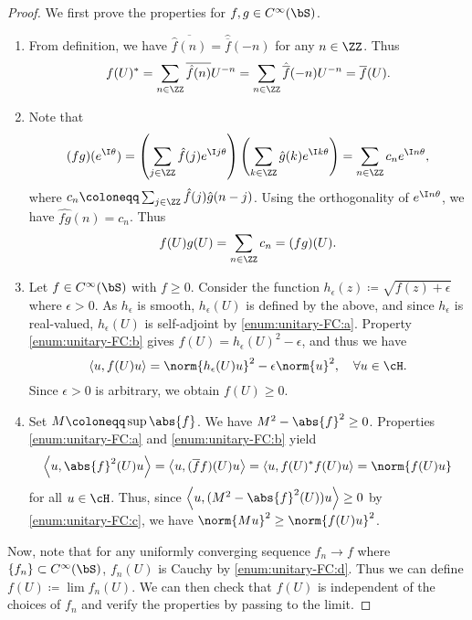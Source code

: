 \documentclass[oneside,reqno,letterpaper]{amsart}
\begin{document}
\begin{proof}
  We first prove the properties for \(f, g \in C^{\infty}(\bS)\). 
  \begin{enumerate}[label=(\alph*)]
  \item %
  From definition, we have \(\overline{\hat{f}(n)} = \hat{\overline{f}}(-n)\) for any \(n \in \ZZ\). 
  Thus
  \[
    f(U)^* 
    = \sum_{n \in \ZZ} \overline{\hat{f}(n)} U^{-n}
    = \sum_{n \in \ZZ} \hat{\overline{f}}(-n) U^{-n}
    = \overline{f}(U) .   
  \] 

  \item %
    Note that  
    \[
      (fg)(e^{\I \theta}) 
      = \left( \sum_{j \in \ZZ} \hat{f}(j) e^{\I j \theta} \right) \left( \sum_{k \in \ZZ} \hat{g}(k) e^{\I k \theta} \right) 
      = \sum_{n \in \ZZ} c_n e^{\I n \theta}, 
    \] 
    where \(c_n \coloneqq \sum_{j \in \ZZ} \hat{f}(j) \hat{g}(n - j)\). 
    Using the orthogonality of \(e^{\I n \theta}\), we have \(\widehat{fg}(n) = c_n\). 
    Thus 
    \[
    f(U) g(U)
    = \sum_{n \in \ZZ} c_n
    = (fg)(U) . 
    \] 
    
  \item %
    Let \(f \in C^{\infty}(\bS)\) with \(f \geq 0\). 
    Consider the function \(h_{\epsilon}(z) \coloneqq \sqrt{f(z) + \epsilon}\) where \(\epsilon > 0\). 
    As \(h_{\epsilon}\) is smooth, \(h_{\epsilon}(U)\) is defined by the above, and since \(h_{\epsilon}\) is real-valued, \(h_{\epsilon}(U)\) is self-adjoint by \ref{enum:unitary-FC:a}. 
    Property \ref{enum:unitary-FC:b} gives \(f(U) = h_{\epsilon}(U)^2 - \epsilon\), and thus we have
    \[
      \left< u, f(U) u \right>
      = \norm{h_{\epsilon}(U) u}^2 - \epsilon \norm{u}^2  , \quad \forall u \in \cH . 
    \] 
    Since \(\epsilon > 0\) is arbitrary, we obtain \(f(U) \geq 0\). 

  \item %
    Set \(M \coloneqq \sup \abs{f}\). 
    We have \(M^2 - \abs{f}^2 \geq 0\). 
    Properties \ref{enum:unitary-FC:a} and \ref{enum:unitary-FC:b} yield
    \[
      \left< u, \abs{f}^2 (U) u  \right>
      = \left< u, (\overline{f} f) (U) u \right>
      = \left< u, f(U)^* f(U) u \right> 
      = \norm{f(U) u} 
    \] 
    for all \(u \in \cH\). 
    Thus, since \(\left< u, (M^2 - \abs{f}^2(U)) u \right> \geq 0\) by \ref{enum:unitary-FC:c}, we have \(\norm{M u}^2 \geq \norm{f(U)u}^2\). 
  \end{enumerate}

  Now, note that for any uniformly converging sequence \(f_{n} \to f\) where \(\{f_{n}\} \subset C^{\infty}(\bS)\), \(f_{n}(U)\) is Cauchy by \ref{enum:unitary-FC:d}.
  Thus we can define \(f(U) \coloneqq \lim f_{n}(U)\). 
  We can then check that \(f(U)\) is independent of the choices of \(f_{n}\) and verify the properties by passing to the limit. 
\end{proof}
\end{document}
